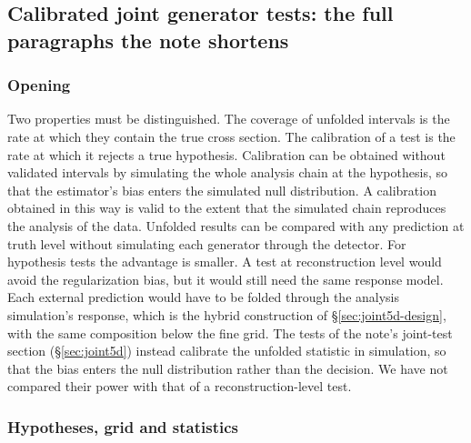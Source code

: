 \subsection{Calibrated joint generator tests: the full paragraphs the note shortens}

\subsubsection{Opening}

Two properties must be distinguished.  The coverage of unfolded intervals is the rate at which they contain the true cross section.  The calibration of a test is the rate at which it rejects a true hypothesis.  Calibration can be obtained without validated intervals by simulating the whole analysis chain at the hypothesis, so that the estimator's bias enters the simulated null distribution.  A calibration obtained in this way is valid to the extent that the simulated chain reproduces the analysis of the data.  Unfolded results can be compared with any prediction at truth level without simulating each generator through the detector. For hypothesis tests the advantage is smaller.  A test at reconstruction level would avoid the regularization bias, but it would still need the same response model.  Each external prediction would have to be folded through the analysis simulation's response, which is the hybrid construction of \S\ref{sec:joint5d-design}, with the same composition below the fine grid.  The tests of the note's joint-test section (\S\ref{sec:joint5d}) instead calibrate the unfolded statistic in simulation, so that the bias enters the null distribution rather than the decision.  We have not compared their power with that of a reconstruction-level test.

\subsubsection{Hypotheses, grid and statistics}

